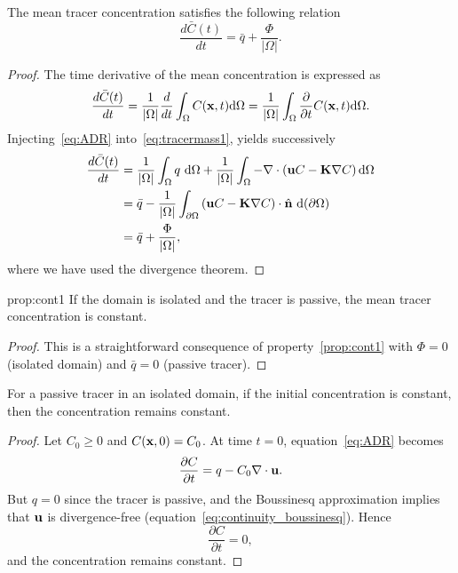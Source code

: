 \begin{property}\label{prop:cont1}
	The mean tracer concentration satisfies the following relation
	\begin{equation}
		\frac{d\bar{C}(t)}{dt} = \bar q + \frac{\Phi}{|\Omega|}.
	\end{equation}
\end{property}
\begin{proof}
	The time derivative of the mean concentration is expressed as
	\begin{equation} \label{eq:tracermass1}
		\frac{d\bar{C}(t)}{dt} = \frac{1}{|\Omega|} \frac{d}{dt} \int_{\Omega} C(\mathbf x,t) \mathrm d\Omega = \frac{1}{|\Omega|} \int_{\Omega} \frac{\partial}{\partial t} C(\mathbf x,t) \mathrm d\Omega.
	\end{equation}
	Injecting~\eqref{eq:ADR} into~\eqref{eq:tracermass1}, yields successively
	\begin{subequations}
	\begin{align}
		\frac{d\bar{C}(t)}{dt} &= \frac{1}{|\Omega|} \int_\Omega q\ \rm d\Omega + \frac{1}{|\Omega|} \int_{\Omega} -\nabla \cdot \left(\b uC - \b K \nabla C\right) \rm d\Omega\\
		 &= \bar q - \frac{1}{|\Omega|} \int_{\partial \Omega} \left(\b uC - \b K \nabla C\right) \cdot \n \ \rm d(\partial \Omega)\\
		 &= \bar q + \frac{\Phi}{|\Omega|},
	\end{align}
	\end{subequations}
	where we have used the divergence theorem.
\end{proof}

\begin{corollary}{prop:cont1} \label{prop:mass-is-constant}
	If the domain is isolated and the tracer is passive, the mean tracer concentration is constant.
\end{corollary}
\begin{proof}
	This is a straightforward consequence of property~\ref{prop:cont1} with $\Phi=0$ (isolated domain) and $\bar q = 0$ (passive tracer). 
\end{proof}

\begin{property}
	For a passive tracer in an isolated domain, if the initial concentration is constant, then the concentration remains constant.
\end{property}
\begin{proof}
	Let $C_0 \ge 0$ and $C(\mathbf x, 0) = C_0$. At time $t=0$, equation~\eqref{eq:ADR} becomes
	\begin{equation}
		\frac{\partial C}{\partial t} = q - C_0 \nabla \cdot \mathbf u.
	\end{equation}
	But $q=0$ since the tracer is passive, and the Boussinesq approximation implies that $\mathbf u$ is divergence-free (equation~\eqref{eq:continuity_boussinesq}). Hence
	\begin{equation}
		\frac{\partial C}{\partial t} = 0,
	\end{equation}
	and the concentration remains constant.
\end{proof}


